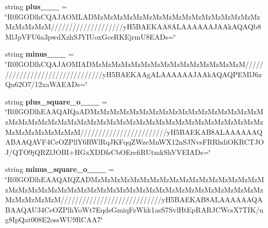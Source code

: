 \begin{DoxyCompactItemize}
\item 
\mbox{\label{class_c_utils_1_1_utils_1_1_resources_1_1_icons_a24bbb4d609eb2fd3363bcc08c2bcfc8c}} 
string {\bfseries plus\+\_\+\_\+\_} = \char`\"{}R0l\+G\+O\+Dlh\+C\+Q\+A\+J\+A\+O\+M\+L\+A\+D\+Mz\+Mz\+Mz\+Mz\+Mz\+Mz\+Mz\+Mz\+Mz\+Mz\+Mz\+Mz\+Mz\+Mz\+Mz\+Mz\+Mz\+Mz\+Mz\+Mz\+MzM////////////////////y\+H5\+B\+A\+E\+K\+A\+A8\+A\+L\+A\+A\+A\+A\+A\+A\+J\+A\+Ak\+A\+Q\+A\+Qb8\+Ml\+Jp\+V\+F\+U6a3pwd\+Xzh\+S\+J\+Y\+I\+Uox\+Gce\+R\+K\+Ejrm\+U8\+E\+A\+Ds=\char`\"{}
\item 
\mbox{\label{class_c_utils_1_1_utils_1_1_resources_1_1_icons_ad250c3b295617aa080dc895a261d541f}} 
string {\bfseries minus\+\_\+\_\+\_} = \char`\"{}R0l\+G\+O\+Dlh\+C\+Q\+A\+J\+A\+O\+M\+I\+A\+D\+Mz\+Mz\+Mz\+Mz\+Mz\+Mz\+Mz\+Mz\+Mz\+Mz\+Mz\+Mz\+Mz\+Mz\+MzM////////////////////////////////y\+H5\+B\+A\+E\+K\+A\+Ag\+A\+L\+A\+A\+A\+A\+A\+A\+J\+A\+Ak\+A\+Q\+A\+Q\+P\+E\+Ml\+J6z\+Qn62\+O7/12xa\+W\+A\+E\+A\+Ds=\char`\"{}
\item 
\mbox{\label{class_c_utils_1_1_utils_1_1_resources_1_1_icons_a111b78f3738b4380cad5144fcfe18bbe}} 
string {\bfseries plus\+\_\+square\+\_\+o\+\_\+\_\+\_} = \char`\"{}R0l\+G\+O\+Dlh\+E\+A\+A\+Q\+A\+I\+Qa\+A\+D\+Mz\+Mz\+Mz\+Mz\+Mz\+Mz\+Mz\+Mz\+Mz\+Mz\+Mz\+Mz\+Mz\+Mz\+Mz\+Mz\+Mz\+Mz\+Mz\+Mz\+Mz\+Mz\+Mz\+Mz\+Mz\+Mz\+Mz\+Mz\+Mz\+Mz\+Mz\+Mz\+Mz\+Mz\+Mz\+Mz\+Mz\+Mz\+Mz\+Mz\+Mz\+Mz\+Mz\+Mz\+Mz\+Mz\+Mz\+Mz\+Mz\+Mz\+MzM////////////////////////y\+H5\+B\+A\+E\+K\+A\+B8\+A\+L\+A\+A\+A\+A\+A\+A\+Q\+A\+B\+A\+A\+Q\+A\+V\+F4\+Ce\+O\+Z\+Pll\+Y6\+R\+Wl\+Rq\+J\+K\+Fqq\+Z\+Wze\+Mn\+W\+X12n\+S\+J\+Nvs\+F\+R\+Rhdi\+O\+K\+R\+C\+T\+J\+OJ/Q\+T\+O9j\+Q\+R\+Zl\+J\+O\+BI+H\+Gx\+X\+D\+Dfs\+Cb\+O\+Erefi\+R\+Utmk\+Sh\+V\+V\+E\+I\+A\+Ds=\char`\"{}
\item 
\mbox{\label{class_c_utils_1_1_utils_1_1_resources_1_1_icons_ad0951f45c1e06f4f361201f0e6279178}} 
string {\bfseries minus\+\_\+square\+\_\+o\+\_\+\_\+\_} = \char`\"{}R0l\+G\+O\+Dlh\+E\+A\+A\+Q\+A\+I\+Q\+Z\+A\+D\+Mz\+Mz\+Mz\+Mz\+Mz\+Mz\+Mz\+Mz\+Mz\+Mz\+Mz\+Mz\+Mz\+Mz\+Mz\+Mz\+Mz\+Mz\+Mz\+Mz\+Mz\+Mz\+Mz\+Mz\+Mz\+Mz\+Mz\+Mz\+Mz\+Mz\+Mz\+Mz\+Mz\+Mz\+Mz\+Mz\+Mz\+Mz\+Mz\+Mz\+Mz\+Mz\+Mz\+Mz\+Mz\+Mz\+Mz\+Mz\+MzM////////////////////////////y\+H5\+B\+A\+E\+K\+A\+B8\+A\+L\+A\+A\+A\+A\+A\+A\+Q\+A\+B\+A\+A\+Q\+A\+U34\+Ce\+O\+Z\+Plh\+Yo\+Wt7\+Eqds\+Gmiq\+Fz\+Wkk1as\+S7\+Svl\+Ht\+Ep\+R\+A\+R\+J\+C\+Wcs\+X7\+T\+IK/ng8\+Ip\+Qat008\+E2oss\+W\+U9\+R\+C\+A\+A7\char`\"{}

\end{DoxyCompactItemize}
